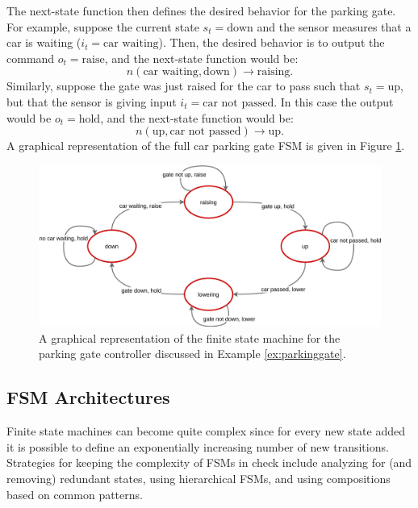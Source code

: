 \begin{example}
The next-state function then defines the desired behavior for the parking gate. For example, suppose the current state $s_t = \text{down}$ and the sensor measures that a car is waiting ($i_t = \text{car waiting}$). Then, the desired behavior is to output the command $o_t = \text{raise}$, and the next-state function would be:
\begin{equation*}
    n(\text{car waiting}, \text{down}) \xrightarrow{} \text{raising}.
\end{equation*}
Similarly, suppose the gate was just raised for the car to pass such that $s_t = \text{up}$, but that the sensor is giving input $i_t = \text{car not passed}$. In this case the output would be $o_t = \text{hold}$, and the next-state function would be:
\begin{equation*}
    n(\text{up}, \text{car not passed}) \xrightarrow{} \text{up}.
\end{equation*}
A graphical representation of the full car parking gate FSM is given in Figure \ref{fig:parkinggate}.
\begin{figure}[ht]
    \centering
    \includegraphics[width=1\textwidth]{tex/figs/ch19_figs/parkinggate_fsm.png}
    \caption{A graphical representation of the finite state machine for the parking gate controller discussed in Example \ref{ex:parkinggate}.}
    \label{fig:parkinggate}
\end{figure}
\end{example}

\subsection{FSM Architectures}
Finite state machines can become quite complex since for every new state added it is possible to define an exponentially increasing number of new transitions. Strategies for keeping the complexity of FSMs in check include analyzing for (and removing) redundant states, using hierarchical FSMs, and using compositions based on common patterns.

